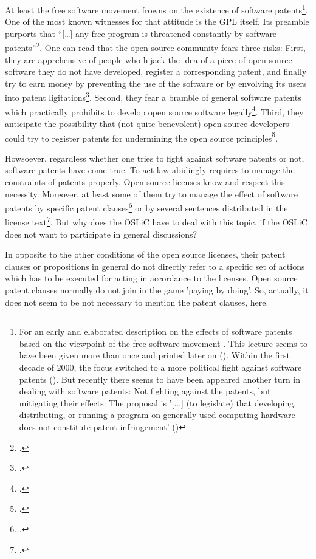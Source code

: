 At least the free software movement frowns on the existence of software
patents\footnote{For an early and elaborated description on the effects of
software patents based on the viewpoint of the free software movement
\cite[see][\nopage wp]{Stallman2001a}. This lecture seems to have been given
more than once and printed later on (\cite[cf.][\nopage wp]{Stallman2002a}).
Within the first decade of 2000, the focus switched to a more political fight
against software patents (\cite[cf.][\nopage wp]{Stallman2004a}). But recently
there seems to have been appeared another turn in dealing with software patents:
Not fighting against the patents, but mitigating their effects: The proposal is
'[...] (to legislate) that developing, distributing, or running a program on
generally used computing hardware does not constitute patent infringement'
(\cite[cf.][\nopage wp]{Stallman2012a})}. One of the most known witnesses for
that attitude is the GPL itself. Its preamble purports that \enquote{[\ldots]
any free program is threatened constantly by software
patents}\footcite[cf.][wp]{Gpl20OsiLicense1991a}. One can read that the open
source community fears three risks: First, they are apprehensive of people who
hijack the idea of a piece of open source software they do not have developed,
register a corresponding patent, and finally try to earn money by preventing the
use of the software or by envolving its users into patent
ligitations\footcite[cf.][234]{JaeMet2011a}. Second, they fear a bramble of
general software patents which practically prohibits to develop open source
software legally\footcite[cf.][234]{JaeMet2011a}. Third, they anticipate the
possibility that (not quite benevolent) open source developers could try to
register patents for undermining the open source
principles\footcite[cf.][235]{JaeMet2011a}.

Howsoever, regardless whether one tries to fight against software patents or not,
software patents have come true. To act law-abidingly requires to manage the
constraints of patents properly. Open source licenses know and respect this
necessity. Moreover, at least some of them try to manage the effect of software
patents by specific patent clauses\footcite[pars pro toto cf.][\nopage wp.
§3]{Apl20OsiLicense2004a} or by several sentences distributed in the license
text\footcite[pars pro toto cf.][\nopage wp.]{Epl10OsiLicense2005a}. But why
does the OSLiC have to deal with this topic, if the OSLiC does not want to
participate in general discussions?

In opposite to the other conditions of the open source licenses, their patent
clauses or propositions in general do not directly refer to a specific set of
actions which has to be executed for acting in accordance to the licenses. Open
source patent clauses normally do not join in the game 'paying by doing'. So,
actually, it does not seem to be not necessary to mention the patent clauses,
here.

